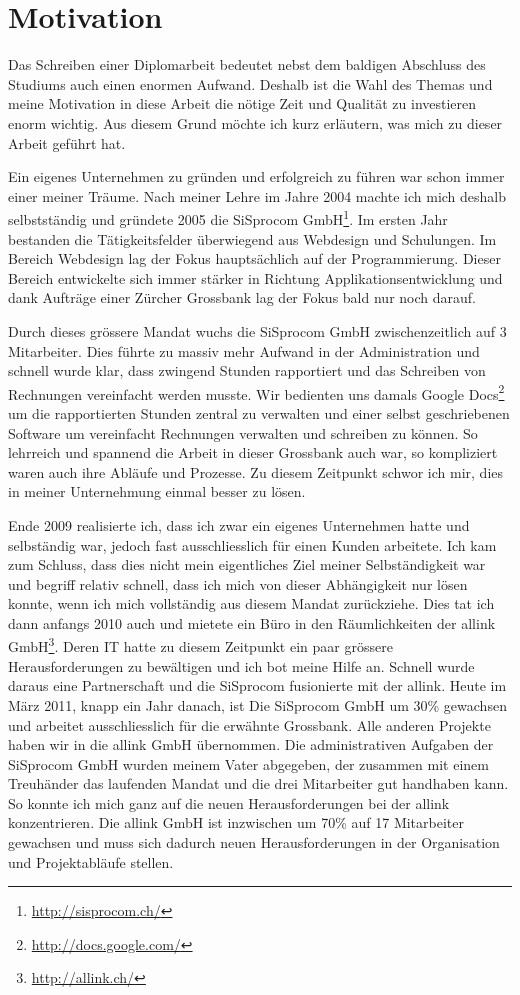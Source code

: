 \section{Motivation}
Das Schreiben einer Diplomarbeit bedeutet nebst dem baldigen Abschluss des Studiums
auch einen enormen Aufwand. Deshalb ist die Wahl des Themas und meine
Motivation in diese Arbeit die nötige Zeit und Qualität zu investieren enorm
wichtig. Aus diesem Grund möchte ich kurz erläutern, was mich zu dieser
Arbeit geführt hat.

Ein eigenes Unternehmen zu gründen und erfolgreich zu führen war schon immer
einer meiner Träume. Nach meiner Lehre im Jahre 2004 machte ich mich deshalb
selbstständig und gründete 2005 die SiSprocom GmbH\footnote{\url{http://sisprocom.ch/}}. 
Im ersten Jahr bestanden
die Tätigkeitsfelder überwiegend aus Webdesign und Schulungen. Im Bereich
Webdesign lag der Fokus hauptsächlich auf der Programmierung. Dieser Bereich 
entwickelte sich immer stärker in Richtung 
Applikationsentwicklung und dank Aufträge einer Zürcher Grossbank 
lag der Fokus bald nur noch darauf.

Durch dieses grössere Mandat wuchs die SiSprocom GmbH zwischenzeitlich
auf 3 Mitarbeiter. Dies führte zu massiv mehr Aufwand in der Administration
und schnell wurde klar, dass zwingend Stunden rapportiert und das Schreiben
von Rechnungen vereinfacht werden musste. Wir bedienten uns damals Google 
Docs\footnote{\url{http://docs.google.com/}} um die rapportierten Stunden zentral zu 
verwalten und einer selbst geschriebenen Software um vereinfacht Rechnungen 
verwalten und schreiben zu können.
So lehrreich und spannend die Arbeit in dieser Grossbank auch war, so kompliziert
waren auch ihre Abläufe und Prozesse. Zu diesem Zeitpunkt schwor ich mir, dies
in meiner Unternehmung einmal besser zu lösen.

Ende 2009 realisierte ich, dass ich zwar ein eigenes Unternehmen hatte und
selbständig war, jedoch fast ausschliesslich für einen Kunden arbeitete.
Ich kam zum Schluss, dass dies nicht mein eigentliches Ziel meiner Selbständigkeit 
war und begriff
relativ schnell, dass ich mich von dieser Abhängigkeit nur lösen konnte, wenn
ich mich vollständig aus diesem Mandat zurückziehe.
Dies tat ich dann anfangs 2010 auch und mietete ein Büro in den Räumlichkeiten
der allink GmbH\footnote{\url{http://allink.ch/}}. Deren IT hatte zu diesem Zeitpunkt 
ein paar grössere
Herausforderungen zu bewältigen und ich bot meine Hilfe an. Schnell wurde
daraus eine Partnerschaft und die SiSprocom fusionierte mit der allink.
Heute im März 2011, knapp ein Jahr danach, ist Die SiSprocom GmbH um 30\% 
gewachsen und arbeitet ausschliesslich für die erwähnte Grossbank. Alle anderen Projekte
haben wir in die allink GmbH übernommen. Die administrativen Aufgaben der
SiSprocom GmbH wurden
meinem Vater abgegeben, der zusammen mit einem Treuhänder das laufenden
Mandat und die drei Mitarbeiter gut handhaben kann. So konnte ich mich ganz
auf die neuen Herausforderungen bei der allink konzentrieren.
Die allink GmbH ist inzwischen um 70\% auf 17 Mitarbeiter gewachsen und muss sich dadurch
neuen Herausforderungen in der Organisation und Projektabläufe stellen.

